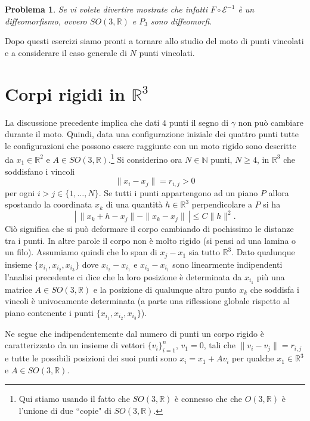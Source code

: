\documentclass{amsart}
\numberwithin{equation}{section}
\newtheorem{pro}{Problema}
\newcommand\cE{{\mathcal E}}
\newcommand\bN{{\mathbb N}}
\newcommand\bR{{\mathbb R}}
\begin{document}
\begin{pro} Se vi volete divertire mostrate che infatti $F\circ \cE^{-1}$ \`e un diffeomorfismo, ovvero  $SO(3,\bR)$ e $P_3$ sono diffeomorfi.
\end{pro}
Dopo questi esercizi siamo pronti a tornare allo studio del moto di punti vincolati e a considerare il caso generale di $N$ punti vincolati.
\section{Corpi rigidi in $\bR^3$}
La discussione precedente implica che dati $4$ punti il segno di $\gamma$ non pu\`o cambiare durante il moto. Quindi, data una configurazione iniziale dei quattro punti tutte le configurazioni che possono essere raggiunte con un moto rigido sono descritte da $x_1\in\bR^2$ e $A\in SO(3,\bR)$.\footnote{ Qui stiamo usando il fatto che $SO(3,\bR)$ \`e connesso che che $O(3,\bR)$ \`e l'unione di due ``copie" di $SO(3,\bR)$.}
Si considerino ora $N\in\bN$ punti, $N\geq 4$, in $\bR^3$ che soddisfano i vincoli
\begin{equation}\label{eq:vincoli}
\|x_i-x_j\|=r_{i,j}>0
\end{equation}
per ogni $i>j\in \{1,\dots, N\}$. Se tutti i punti appartengono ad un piano $P$ allora spostando la coordinata $x_k$ di una quantit\`a $h\in\bR^3$ perpendicolare a $P$ si ha
\[
|\,\|x_k+h-x_j\|-\|x_k-x_j\|\,|\leq C\|h\|^2.
\]
Ci\`o significa che si pu\`o deformare il corpo cambiando di pochissimo le distanze tra i punti. In altre parole il corpo non \`e molto rigido (si pensi ad una lamina o un filo).
Assumiamo quindi che lo span di $x_j-x_1$ sia tutto $\bR^3$. Dato qualunque insieme $\{x_{i_1}, x_{i_2}, x_{i_3}\}$ dove $x_{i_2}-x_{i_1}$ e $x_{i_3}-x_{i_1}$ sono linearmente indipendenti l'analisi precedente ci dice che la loro posizione \`e determinata da $x_{i_1}$ pi\`u una matrice $A\in SO(3,\bR)$ e la posizione di qualunque altro punto $x_k$ che soddisfa i vincoli \`e univocamente determinata (a parte una riflessione globale rispetto al piano contenente i punti $\{x_{i_1}, x_{i_2}, x_{i_3}\}$).

Ne segue che indipendentemente dal numero di punti un corpo rigido \`e caratterizzato da un insieme di vettori $\{v_i\}_{i=1}^n$, $v_1=0$, tali che $\|v_i-v_j\|=r_{i,j}$ e tutte le possibili posizioni dei suoi punti sono $x_i=x_1+Av_i$ per qualche $x_1\in\bR^3$ e $A\in SO(3,\bR)$.
\end{document}
